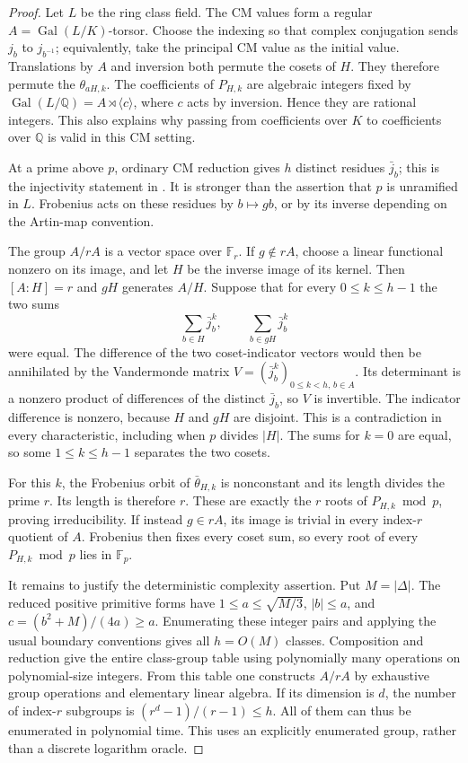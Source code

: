 \documentclass[11pt]{article}
\theoremstyle{definition}
\theoremstyle{remark}
\begin{document}
\begin{proof}
Let $L$ be the ring class field.  The CM values form a regular
$A=\operatorname{Gal}(L/K)$-torsor.
Choose the indexing so that complex conjugation sends $j_b$ to
$j_{b^{-1}}$; equivalently, take the principal CM value as the
initial value.
Translations by $A$ and inversion both permute the cosets of $H$.
They therefore permute the $\theta_{aH,k}$.
The coefficients of $P_{H,k}$ are algebraic integers fixed by
$\operatorname{Gal}(L/\mathbb Q)=A\rtimes\langle c\rangle$,
where $c$ acts by inversion.  Hence they are rational integers.
This also explains why passing from coefficients over $K$ to
coefficients over $\mathbb Q$ is valid in this CM setting.

At a prime above $p$, ordinary CM reduction gives $h$ distinct
residues $\bar j_b$; this is the injectivity statement in
\cite[\S\S2.3--2.4, Proposition~4]{CremonaSutherland2024}.
It is stronger than the assertion that $p$ is unramified in $L$.
Frobenius acts on these residues by $b\mapsto gb$, or by its inverse
depending on the Artin-map convention.

The group $A/rA$ is a vector space over $\mathbb F_r$.
If $g\notin rA$, choose a linear functional nonzero on its image,
and let $H$ be the inverse image of its kernel.
Then $[A:H]=r$ and $gH$ generates $A/H$.
Suppose that for every $0\le k\le h-1$ the two sums
\[
 \sum_{b\in H}\bar j_b^k,
 \qquad
 \sum_{b\in gH}\bar j_b^k
\]
were equal.
The difference of the two coset-indicator vectors would then be
annihilated by the Vandermonde matrix
$V=(\bar j_b^k)_{0\le k<h,\,b\in A}$.
Its determinant is a nonzero product of differences of the distinct
$\bar j_b$, so $V$ is invertible.
The indicator difference is nonzero, because $H$ and $gH$ are
disjoint.  This is a contradiction in every characteristic,
including when $p$ divides $|H|$.
The sums for $k=0$ are equal, so some $1\le k\le h-1$
separates the two cosets.

For this $k$, the Frobenius orbit of $\bar\theta_{H,k}$ is
nonconstant and its length divides the prime $r$.
Its length is therefore $r$.
These are exactly the $r$ roots of $P_{H,k}\bmod p$, proving
irreducibility.
If instead $g\in rA$, its image is trivial in every index-$r$
quotient of $A$.  Frobenius then fixes every coset sum, so every
root of every $P_{H,k}\bmod p$ lies in $\mathbb F_p$.

It remains to justify the deterministic complexity assertion.
Put $M=|\Delta|$.
The reduced positive primitive forms have
$1\le a\le\sqrt{M/3}$, $|b|\le a$, and
$c=(b^2+M)/(4a)\ge a$.
Enumerating these integer pairs and applying the usual boundary
conventions gives all $h=O(M)$ classes.
Composition and reduction give the entire class-group table using
polynomially many operations on polynomial-size integers.
From this table one constructs $A/rA$ by exhaustive group operations
and elementary linear algebra.
If its dimension is $d$, the number of index-$r$ subgroups is
$(r^d-1)/(r-1)\le h$.
All of them can thus be enumerated in polynomial time.
This uses an explicitly enumerated group, rather than a discrete
logarithm oracle.


\end{proof}
\end{document}
